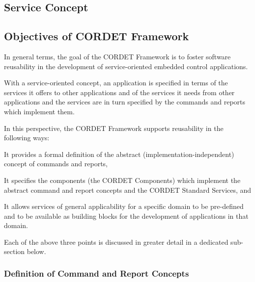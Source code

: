 \documentclass[a4paper,10pt]{article}
\newenvironment{fw_enumerate}					%
{\begin{enumerate}
  \setlength{\itemsep}{1mm}
  \setlength{\parskip}{0pt}
  \setlength{\parsep}{0pt}}
{\end{enumerate}}
\begin{document}
\subsection{Service Concept}\label{sec:ServConcept} 


\subsection{Objectives of CORDET Framework}\label{sec:ObjectivesOfCrFw} 

In general terms, the goal of the CORDET Framework is to foster software reusability in the development of service-oriented embedded control applications. 

With a service-oriented concept, an application is specified in terms of the services it offers to other applications and of the services it needs from other applications and the services are in turn specified by the commands and reports which implement them.

In this perspective, the CORDET Framework supports reusability in the following ways:

\begin{fw_enumerate}
\item{} It provides a formal definition of the abstract (implementation-independent) concept of commands and reports,
\item{} It specifies the components (the CORDET Components) which implement the abstract command and report concepts and the CORDET Standard Services, and
\item{} It allows services of general applicability for a specific domain to be pre-defined and to be available as building blocks for the development of applications in that domain.
\end{fw_enumerate}

Each of the above three points is discussed in greater detail in a dedicated sub-section below. 

\subsubsection{Definition of Command and Report Concepts}\label{sec:DefCmdRepConcepts}
\end{document}
